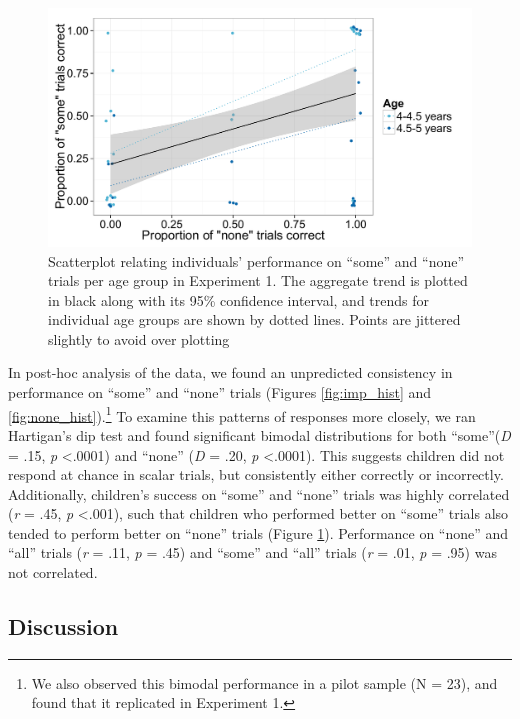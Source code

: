 \documentclass[man]{apa2}
\begin{document}
\begin{figure} 
 \begin{center} 
  \includegraphics[scale=.55]{figures/exp1_diffs.pdf} 
  \caption{\label{fig:exp1_diffs} Scatterplot relating individuals' performance on ``some'' and ``none'' trials per age group in Experiment 1. The aggregate trend is plotted in black along with its 95\% confidence interval, and trends for individual age groups are shown by dotted lines. Points are jittered slightly to avoid over plotting} 
 \end{center} 
\end{figure}

In post-hoc analysis of the data, we found an unpredicted consistency in performance on ``some'' and ``none'' trials (Figures \ref{fig:imp_hist} and \ref{fig:none_hist}).\footnote{We also observed this bimodal performance in a pilot sample (N = 23), and found that it replicated in Experiment 1.}  To examine this patterns of responses more closely, we ran Hartigan's dip test and found significant bimodal distributions for both ``some''(\textit{D} = .15, \textit{p} \textless  .0001) and ``none'' (\textit{D} = .20, \textit{p} \textless  .0001). This suggests children did not respond at chance in scalar trials, but consistently either correctly or incorrectly. Additionally, children's success on ``some'' and ``none'' trials was highly correlated (\textit{r} = .45, \textit{p} \textless  .001), such that children who performed better on ``some'' trials also tended to perform better on ``none'' trials (Figure \ref{fig:exp1_diffs}). Performance on ``none'' and ``all'' trials (\textit{r} = .11, \textit{p} = .45) and ``some'' and ``all'' trials (\textit{r} = .01, \textit{p} = .95) was not correlated. 

\subsection{Discussion}
\end{document}
